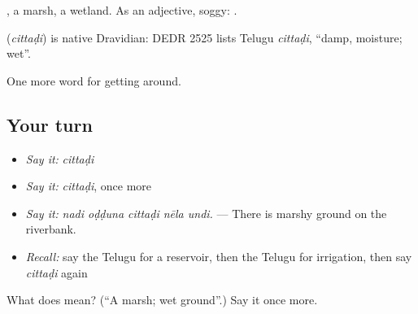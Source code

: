  , a marsh, a wetland. As an adjective, soggy:  .

\begin{cousinweb}
\textbf{} (\emph{cittaḍi}) is native Dravidian: DEDR 2525 lists Telugu \emph{cittaḍi}, \textquotedblleft{}damp, moisture; wet\textquotedblright{}.
\end{cousinweb}

\begin{grammarlens}[title={What you've built}]
One more word for getting around.
\end{grammarlens}

\subsection*{Your turn}
\begin{itemize}
\raggedright
  \item \emph{Say it:} \emph{cittaḍi}
  \item \emph{Say it:} \emph{cittaḍi}, once more
  \item \emph{Say it:} \emph{nadi oḍḍuna cittaḍi nēla undi.} — There is marshy ground on the riverbank.
  \item \emph{Recall:} say the Telugu for a reservoir, then the Telugu for irrigation, then say \emph{cittaḍi} again
\end{itemize}

\begin{tcolorbox}[breakable,colback=teal!4,colframe=teal!35!black,title={Before you move on}]
What does  mean? (\textquotedblleft{}A marsh; wet ground\textquotedblright{}.) Say it once more.
\end{tcolorbox}
